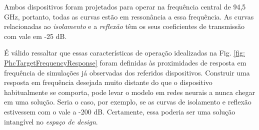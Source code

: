 Ambos dispositivos foram projetados para operar na frequência central de 94,5 GHz, portanto, todas as curvas estão em ressonância a essa frequência. As curvas relacionadas ao \textit{isolamento} e a \textit{reflexão} têm os seus coeficientes de transmissão com vale em -25 dB.

É válido ressaltar que essas características de operação idealizadas na Fig. \ref{fig: PhcTargetFrequencyResponse} foram definidas às proximidades de resposta em frequência de simulações já observadas dos referidos dispositivos. Construir uma resposta em frequência desejada muito distante do que o dispositivo habitualmente se comporta, pode levar o modelo em redes neurais a nunca chegar em uma solução. Seria o caso, por exemplo, se as curvas de isolamento e reflexão estivessem com o vale a -200 dB. Certamente, essa poderia ser uma solução intangível no \textit{espaço de design}.
